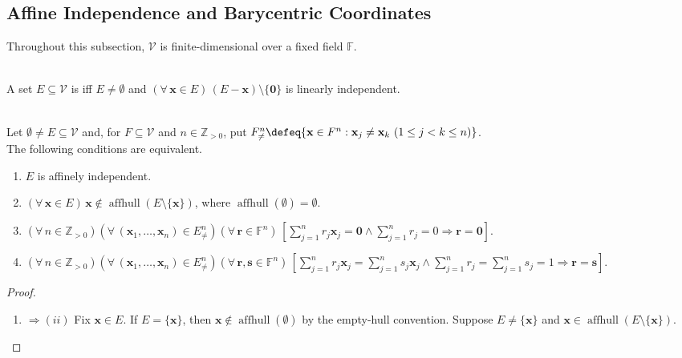 \subsection{Affine Independence and Barycentric Coordinates}

Throughout this subsection, $\mathcal{V}$ is finite-dimensional over a fixed field $\mathbb{F}$.

\begin{definition} \label{def:affinely-independent-set} \\
A set $E\subseteq\mathcal{V}$ is  iff $E\neq\emptyset$ and $(\forall\,\mathbf{x}\in E)\,(E-\mathbf{x})\setminus\{\mathbf{0}\}$ is linearly independent.
\end{definition}

\begin{theorem} \label{thm:affine-independence-equivalences} \\
Let $\emptyset\neq E\subseteq\mathcal{V}$ and, for $F\subseteq\mathcal{V}$ and $n\in\mathbb{Z}_{>0}$, put $F_{\neq}^n\defeq\{\mathbf{x}\in F^n:\mathbf{x}_j\neq\mathbf{x}_k\ (1\leq j<k\leq n)\}$.\\
The following conditions are equivalent.
\begin{enumerate}[label=(\roman*)]
\setlength{\itemsep}{0pt}
\item $E$ is affinely independent.
\item $(\forall\,\mathbf{x}\in E)\,\mathbf{x}\notin\operatorname{affhull}(E\setminus\{\mathbf{x}\})$, where $\operatorname{affhull}(\emptyset)=\emptyset$.
\item $(\forall\,n\in\mathbb{Z}_{>0})(\forall\,(\mathbf{x}_1,\ldots,\mathbf{x}_n)\in E_{\neq}^n)(\forall\,\mathbf{r}\in\mathbb{F}^n)\,[\sum\limits_{j=1}^n r_j\mathbf{x}_j=\mathbf{0}\land\sum\limits_{j=1}^n r_j=0\Rightarrow\mathbf{r}=\mathbf{0}]$.
\item $(\forall\,n\in\mathbb{Z}_{>0})(\forall\,(\mathbf{x}_1,\ldots,\mathbf{x}_n)\in E_{\neq}^n)(\forall\,\mathbf{r},\mathbf{s}\in\mathbb{F}^n)\,[\sum\limits_{j=1}^n r_j\mathbf{x}_j=\sum\limits_{j=1}^n s_j\mathbf{x}_j\land\sum\limits_{j=1}^n r_j=\sum\limits_{j=1}^n s_j=1\Rightarrow\mathbf{r}=\mathbf{s}]$.
\end{enumerate}
\begin{proof}
\begin{enumerate}[label=(\roman*)]
\setlength{\itemsep}{0pt}
\item[$(i)$]$\Rightarrow (ii)$ Fix $\mathbf{x}\in E$. If $E=\{\mathbf{x}\}$, then $\mathbf{x}\notin\operatorname{affhull}(\emptyset)$ by the empty-hull convention. Suppose $E\neq\{\mathbf{x}\}$ and $\mathbf{x}\in\operatorname{affhull}(E\setminus\{\mathbf{x}\})$.\\

\end{enumerate}
\end{proof}
\end{theorem}
